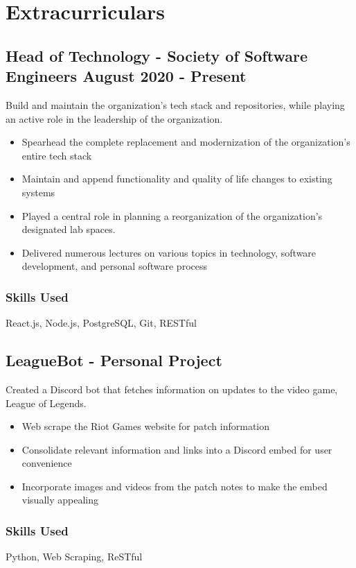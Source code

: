 \documentclass[11pt, letterpaper]{article}
\begin{document}
    \section{Extracurriculars}
        \subsection{Head of Technology - Society of Software Engineers \hfill August 2020 - Present}
            Build and maintain the organization's tech stack and repositories, while playing an active role in 
            the leadership of the organization. 
            \begin{itemize}[nosep]
                \item Spearhead the complete replacement and modernization of the organization's 
                        entire tech stack
                \item Maintain and append functionality and quality of life changes to existing systems 
                \item Played a central role in planning a reorganization of the organization's designated lab
                        spaces. 
                \item Delivered numerous lectures on various topics in technology, software development, 
                        and personal software process
            \end{itemize}
            \subsubsection{Skills Used}
                React.js, Node.js, PostgreSQL, Git, RESTful
        \subsection{LeagueBot - Personal Project}
            Created a Discord bot that fetches information on updates to the video game, League 
            of Legends.
            \begin{itemize}[nosep]
                \item Web scrape the Riot Games website for patch information
                \item Consolidate relevant information and links into a Discord embed for user convenience
                \item Incorporate images and videos from the patch notes to make the embed visually appealing
            \end{itemize}
            \subsubsection{Skills Used}
                Python, Web Scraping, ReSTful
\end{document}
